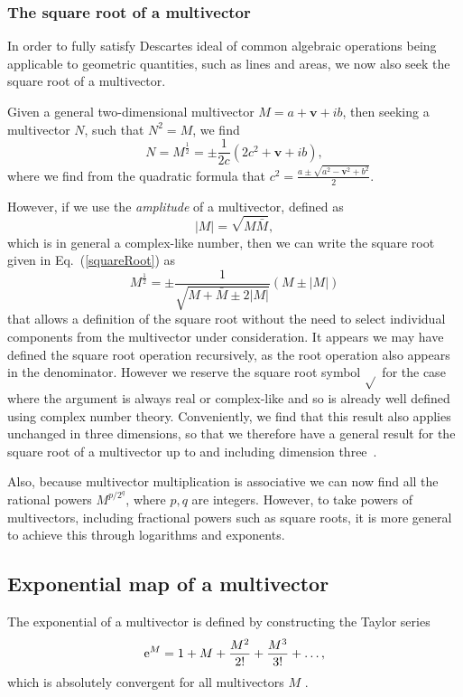 \documentclass[prb,preprint]{revtex4}
\newcommand{\be}{\begin{equation}}
\newcommand{\ee}{\end{equation}}
\newcommand{\rme}{{\rm{e}}}
\newcommand{\iGAT}{{i}}
\newcommand{\cliffconj}[1] { \bar{#1} }
\begin{document}
\subsubsection{The square root of a multivector}

In order to fully satisfy Descartes ideal of common algebraic operations being applicable to geometric quantities, such as lines and areas, we now also seek the square root of a multivector. 

Given a general two-dimensional multivector $ M = a + \boldsymbol{v} + \iGAT b $, then seeking a multivector $ N $, such that $ N^2 = M $, we find
\be \label{squareRoot}
N = M^{\frac{1}{2}} = \pm \frac{1}{2 c} \left ( 2 c^2 +  \boldsymbol{v} + \iGAT b \right ),
\ee
where we find from the quadratic formula that $ c^2 = \frac{a \pm \sqrt{a^2 - \boldsymbol{v}^2 + b^2 } }{2} $. 

However, if we use the {\it{amplitude}} of a multivector, defined as
\be
|M| = \sqrt{M \cliffconj{M}},
\ee
which is in general a complex-like number, then we can write the square root given in Eq.~(\ref{squareRoot}) as
\be \label{squareRoot2Dand3D}
M^{\frac{1}{2}} = \pm \frac{1}{\sqrt{M+\cliffconj{M} \pm 2 |M|}} \left ( M \pm |M| \right )
\ee
that allows a definition of the square root without the need to select individual components from the multivector under consideration.  It appears we may have defined the square root operation recursively, as the root operation also appears in the denominator.  However we reserve the square root symbol $ \sqrt{} $ for the case where the argument is always real or complex-like and so is already well defined using complex number theory.
Conveniently, we find that this result also applies unchanged in three dimensions, so that we therefore have a general result for the square root of a multivector up to and including dimension three~\cite{Chappell2015}.

Also, because multivector multiplication is associative we can now find all the rational  powers $ M^{p/2^q} $, where $ p,q $ are integers.   However, to take powers of multivectors, including fractional powers such as square roots, it is more general to achieve this through logarithms and exponents.

\subsection*{Exponential map of a multivector}

The exponential of a multivector is defined by constructing the Taylor series 
\be \label{exponentialMultivector}
\rme^M = 1 + M +\frac{M^2}{2!} + \frac{M^3}{3!} + \dots,
\ee
which is absolutely convergent for all multivectors $ M $ \citep{Hestenes111}.
\end{document}
